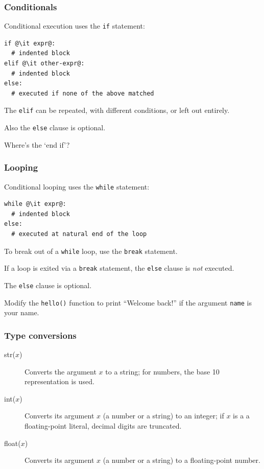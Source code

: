 \documentclass[english,serif,mathserif,xcolor=pdftex,dvipsnames,table]{beamer}
\begin{document}
\begin{frame}[fragile]
  \frametitle{Conditionals}
  Conditional execution uses the \texttt{if} statement:
\begin{lstlisting}
if @\it expr@:
  # indented block
elif @\it other-expr@:
  # indented block
else:
  # executed if none of the above matched
\end{lstlisting}

  \+ The \texttt{elif} can be repeated, with different conditions, or
  left out entirely.

  \+
  Also the \texttt{else} clause is optional.

  \+
  \begin{question}
    Where's the `end if'?

  \end{question}
\end{frame}


\begin{frame}[fragile]
  \frametitle{Looping}
  Conditional looping uses the \texttt{while} statement:
\begin{lstlisting}
while @\it expr@:
  # indented block
else:
  # executed at natural end of the loop
\end{lstlisting}

  \+
  To break out of a \texttt{while} loop, use the \texttt{break}
  statement.

  \+
  If a loop is exited via a \texttt{break} statement, the
  \texttt{else} clause is \emph{not} executed.

  \+
  The \texttt{else} clause is optional.
\end{frame}


\begin{frame}
  \begin{exercise}
    Modify the \texttt{hello()} function to print ``Welcome back!'' if
    the argument \texttt{name} is your name.
  \end{exercise}
\end{frame}


\begin{frame}[fragile,label=typeconv]
  \frametitle{Type conversions}
  \begin{description}
  \item[str($x$)] Converts the argument $x$ to a string; for numbers,
    the base 10 representation is used.
  \item[int($x$)] Converts its argument $x$ (a number or a string) to an integer;
    if $x$ is a a floating-point literal, decimal digits are truncated.
  \item[float($x$)] Converts its argument $x$ (a number or a string) to a
    floating-point number.
  \end{description}

  \hyperlink{func1}{}
\end{frame}
\end{document}
